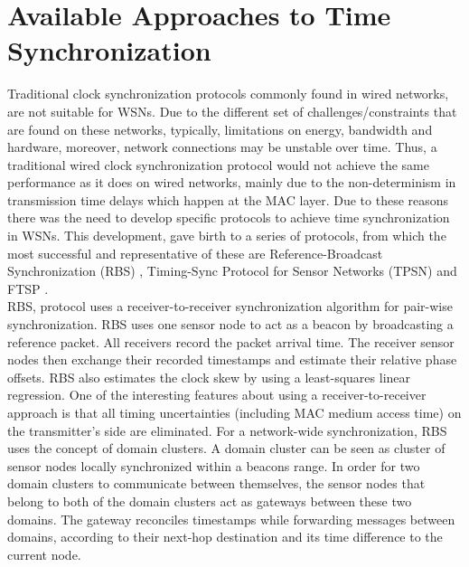 \section{Available Approaches to Time Synchronization}
\label{relwork}

Traditional clock synchronization protocols commonly found in wired networks, are not suitable for WSNs. Due to the different set of challenges/constraints that are found on these networks, typically, limitations on energy, bandwidth and hardware, moreover, network connections may be unstable over time. Thus, a traditional wired clock synchronization protocol would not achieve the same performance as it does on wired networks, mainly due to the non-determinism in transmission time delays which happen at the MAC layer. Due to these reasons there was the need to develop specific protocols to achieve time synchronization in WSNs. This development, gave birth to a series of protocols, from which the most successful and representative of these are Reference-Broadcast Synchronization (RBS) \cite{Elson02-RBS}, Timing-Sync Protocol for Sensor Networks (TPSN) \cite{Ganeriwal03:TPSN} and FTSP \cite{Maroti04:FTSP}.\\
 
RBS, protocol uses a receiver-to-receiver synchronization algorithm for pair-wise synchronization. RBS uses one sensor node to act as a beacon by broadcasting a reference packet. All receivers record the packet arrival time. The receiver sensor nodes then exchange their recorded timestamps and estimate their relative phase offsets. RBS also estimates the clock skew by using a least-squares linear regression. One of the interesting features about using a receiver-to-receiver approach is that all timing uncertainties (including MAC medium access time) on the transmitter's side are eliminated. For a network-wide synchronization, RBS uses the concept of domain clusters. A domain cluster can be seen as cluster of sensor nodes locally synchronized within a beacons range. In order for two domain clusters to communicate between themselves, the sensor nodes that belong to both of the domain clusters act as gateways between these two domains. The gateway reconciles timestamps while forwarding  messages between domains, according to their next-hop destination and its time difference to the current node.\\

